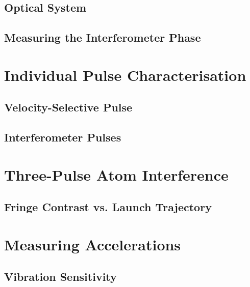 \subsection{Optical System}\label{subsec:photodiode_setup}
\subsection{Measuring the Interferometer Phase}

\section{Individual Pulse Characterisation} \label{sec:atomint_rabiosc}
\subsection{Velocity-Selective Pulse}
\subsection{Interferometer Pulses}

\section{Three-Pulse Atom Interference} \label{sec:atomint_threepulse}
\subsection{Fringe Contrast vs. Launch Trajectory}\label{subsec:launch_contrast}
\section{Measuring Accelerations}\label{sec:atomint_accelerations}
\subsection{Vibration Sensitivity}
